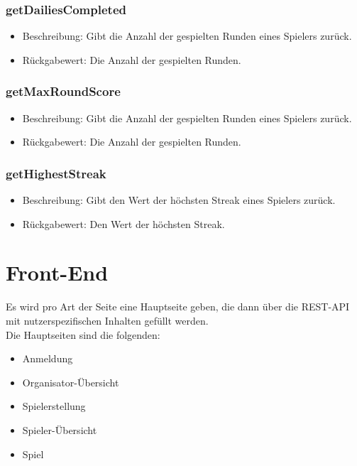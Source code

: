 \documentclass[a4paper]{scrreprt}
\begin{document}
	\subsection{getDailiesCompleted}
	\begin{itemize}
		\item Beschreibung: Gibt die Anzahl der gespielten Runden eines Spielers zurück.
		\item Rückgabewert: Die Anzahl der gespielten Runden.
	\end{itemize}
	\subsection{getMaxRoundScore}
	\begin{itemize}
		\item Beschreibung: Gibt die Anzahl der gespielten Runden eines Spielers zurück.
		\item Rückgabewert: Die Anzahl der gespielten Runden.
	\end{itemize}
	\subsection{getHighestStreak}
	\begin{itemize}
		\item Beschreibung: Gibt den Wert der höchsten Streak eines Spielers zurück.
		\item Rückgabewert: Den Wert der höchsten Streak.
	\end{itemize}




	\chapter{Front-End}
	Es wird pro Art der Seite eine Hauptseite geben, die dann über die REST-API mit nutzerspezifischen Inhalten gefüllt werden. \\
	Die Hauptseiten sind die folgenden: \\
	\begin{itemize}
		\item   Anmeldung
		\item   Organisator-Übersicht
		\item   Spielerstellung
		\item   Spieler-Übersicht
		\item   Spiel
	\end{itemize}
\end{document}
